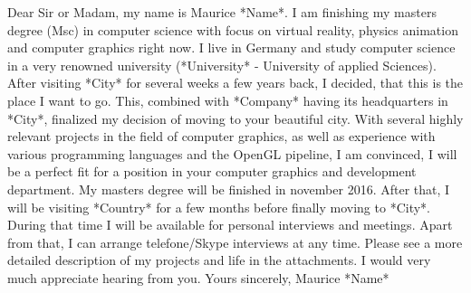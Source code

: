 \documentclass[a4paper, 12pt]{article}
\begin{document}
\justify
Dear Sir or Madam,
\newline
\newline
my name is Maurice \**Name*. I am finishing my masters degree (Msc) in computer science with focus on virtual reality, physics animation
and computer graphics right now.
\newline
\newline
I live in Germany and study computer science in a very renowned university (\**University* - University of applied Sciences).
After visiting \**City* for several weeks a few years back, I decided, that this is the place I want to go. This, combined with \**Company* having its
headquarters in \**City*, finalized my decision of moving to your beautiful city.
\newline
\newline
With several highly relevant projects in the field of computer graphics, as well as experience with various programming languages and the
OpenGL pipeline, I am convinced, I will be a perfect fit for a position in your computer graphics and development department.
\newline
\newline
My masters degree will be finished in november 2016. After that, I will be visiting \**Country* for a few months before finally moving to
\**City*.
During that time I will be available for personal interviews and meetings. Apart from that, I can arrange telefone/Skype interviews at any time.
Please see a more detailed description of my projects and life in the attachments.
\newline
\newline
I would very much appreciate hearing from you.
\newline
\newline
Yours sincerely,
\newline
\newline
Maurice \**Name*
\end{document}
